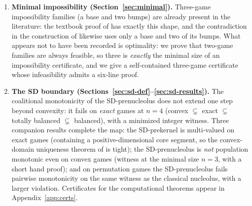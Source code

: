 \documentclass[11pt]{article}
\begin{document}
\begin{enumerate}[leftmargin=2em]
\item \textbf{Minimal impossibility (Section~\ref{sec:minimal}).}
Three-game impossibility families (a base and two bumps) are already
present in the literature: the textbook proof of
\citet[Theorem~8.2.3]{PelegSudholter2003} has exactly this shape, and the
contradiction in the construction of \citet{Arin2013} likewise uses only a
base and two of its bumps. What appears not to have been recorded is
optimality: we prove that two-game families are always feasible, so three
is \emph{exactly} the minimal size of an impossibility certificate, and we
give a self-contained three-game certificate whose infeasibility admits a
six-line proof.

\item \textbf{The SD boundary (Sections~\ref{sec:sd-def}--\ref{sec:sd-results}).}
The coalitional monotonicity of the SD-prenucleolus does not extend one step
beyond convexity: it fails on \emph{exact} games at $n=4$ (convex
$\subsetneq$ exact $\subsetneq$ totally balanced $\subsetneq$ balanced), with
a minimized integer witness. Three companion results complete the map: the
SD-prekernel is multi-valued on exact games (containing a positive-dimensional
core segment, so the convex-domain uniqueness theorem of \citet{ArinKatsev2018}
is tight); the SD-prenucleolus is \emph{not} population monotonic even on
convex games (witness at the minimal size $n=3$, with a short hand proof);
and on permutation games the SD-prenucleolus fails pairwise monotonicity on
the same witness as the classical nucleolus, with a larger violation.
Certificates for the computational theorems appear in
Appendix~\ref{app:certs}.


\end{enumerate}
\end{document}

